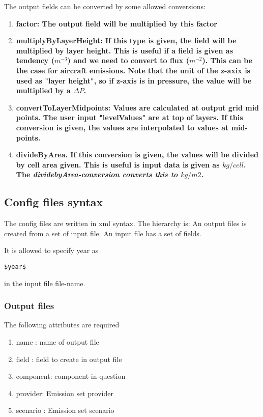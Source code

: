 \documentclass[12pt]{article}
\begin{document}
The output fields can be converted by some allowed conversions:
\begin{enumerate}
\item \bf{factor}: The output field will be multiplied by this factor
\item \bf{multiplyByLayerHeight}: If this type is given, the field will be multiplied by layer height. This is useful if a 
field is given as tendency ($m^{-3}$) and we need to convert to flux ($m^{-2}$). This can be the case for aircraft emissions.
Note that the unit of the z-axix is used as "layer height", so if z-axis is in pressure, the value will be multiplied by a $\Delta P$.
\item \bf{convertToLayerMidpoints}: Values are calculated at output grid mid points. The user input "levelValues" are at top of layers. If
this conversion is given, the values are interpolated to values at mid-points.
\item \bf{divideByArea}. If this conversion is given, the values will be divided by cell area given. This is useful is input data is given
as $kg/cell$. The \it{dividebyArea}-conversion converts this to $kg/m2$.
\end{enumerate}

\subsection{Config files syntax}

The config files are written in xml syntax. 
The hierarchy is: An output files is created from a set of input file. 
An input file has a set of fields. 

It is allowed to specify year as \begin{verbatim}$year$\end{verbatim} in the input file 
file-name. 

\subsubsection{Output files}

The following attributes are required
\begin{enumerate}
\item name : name of output file
\item field : field to create in output file
\item component: component in question
\item provider: Emission set provider
\item scenario : Emission set scenario
\end{enumerate}
\end{document}
